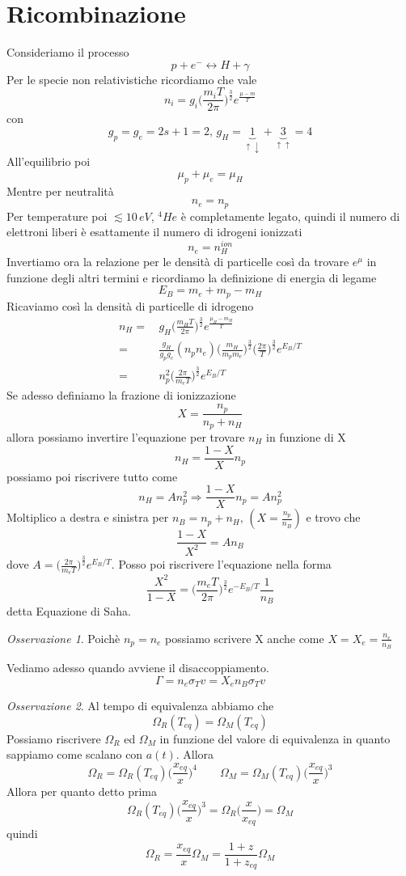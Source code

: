 \documentclass[10pt,a4paper]{article}
\theoremstyle{break}
\theoremstyle{remark}
\newtheorem{oss}{Osservazione}
\theoremstyle{definition}
\newcommand{\ra}{\Rightarrow}
\begin{document}
\section{Ricombinazione}
Consideriamo il processo
\[
p + e^- \longleftrightarrow H + \gamma
\]
Per le specie non relativistiche ricordiamo che vale
\[
n_i = g_i \bigg(\frac{m_i T}{2 \pi}\bigg)^\frac32 e^{\frac{\mu - m}{T}}
\]
con 
\[g_p = g_e = 2s + 1 = 2, \, g_H = \underbrace{1}_{\uparrow\downarrow} + \underbrace{3}_{\uparrow\uparrow} = 4
\]
All'equilibrio poi
\[
\mu_p + \mu_e = \mu_H
\]
Mentre per neutralità
\[
n_e = n_p
\]
Per temperature poi $\lesssim 10 \, eV$, $^4He$ è completamente legato, quindi il numero di elettroni liberi è esattamente il numero di idrogeni ionizzati
\[
n_e = n_H^{ion}
\]
Invertiamo ora la relazione per le densità di particelle così da trovare $e^\mu$ in funzione degli altri termini e ricordiamo la definizione di energia di legame
\[
E_B = m_e + m_p - m_H
\]
Ricaviamo così la densità di particelle di idrogeno
\begin{align*}
n_H =&\, g_H \bigg(\frac{m_H T}{2 \pi}\bigg)^\frac32 e^{\frac{\mu_H - m_H}{T}} \\
    =&\, \frac{g_H}{g_p g_e} (n_p n_e) \bigg(\frac{m_H}{m_p m_e}\bigg)^\frac32\bigg(\frac{2 \pi}{T}\bigg)^\frac32 e^{E_B/T} \\
    =&\, n_p^2 \bigg(\frac{2 \pi}{m_e T}\bigg)^\frac32 e^{E_B/T}
\end{align*}
Se adesso definiamo la frazione di ionizzazione
\[
X = \frac{n_p}{n_p + n_H}
\]
allora possiamo invertire l'equazione per trovare $n_H$ in funzione di X
\[
n_H = \frac{1 - X}{X}n_p
\]
possiamo poi riscrivere tutto come
\[
n_H = A n_p^2 \ra \frac{1 - X}{X} n_p = An_p^2 
\]
Moltiplico a destra e sinistra per $n_B = n_p + n_H,\,(X = \frac{n_p}{n_B})$ e trovo che
\[
\frac{1 - X}{X^2} = A n_B
\]
dove $A = \big(\frac{2 \pi}{m_e T}\big)^\frac32 e^{E_B/T}$. Posso poi riscrivere l'equazione nella forma
\[
\boxed{
	\frac{X^2}{1 - X} = \bigg(\frac{m_e T}{2 \pi}\bigg)^\frac32 e^{-E_B/T}\frac{1}{n_B}
}
\]
detta Equazione di Saha.
\begin{oss}
	Poichè $n_p = n_e$ possiamo scrivere X anche come $X = X_e = \frac{n_e}{n_B}$
\end{oss}

Vediamo adesso quando avviene il disaccoppiamento.
\[
\Gamma = n_e \sigma_T v = X_e n_B \sigma_T v
\]
\begin{oss}
	Al tempo di equivalenza abbiamo che 
	\[
	\Omega_R(T_{eq}) = \Omega_M (T_{eq})
 	\]
 	Possiamo riscrivere $\Omega_R$ ed $\Omega_M$ in funzione del valore di equivalenza in quanto sappiamo come scalano con $a(t)$. Allora
 	\[
 	\Omega_R = \Omega_R(T_{eq}) \bigg(\frac{x_{eq}}{x}\bigg)^4 \qquad \Omega_M = \Omega_M(T_{eq}) \bigg(\frac{x_{eq}}{x}\bigg)^3
 	\]
 	Allora per quanto detto prima
 	\[
 	\Omega_R(T_{eq}) \bigg(\frac{x_{eq}}{x}\bigg)^3 = \Omega_R\bigg(\frac{x}{x_{eq}}\bigg) = \Omega_M
 	\]
 	quindi
 	\[
 	\Omega_R = \frac{x_{eq}}{x} \Omega_M = \frac{1 + z}{1 + z_{eq}}\Omega_M
 	\]
\end{oss}
\end{document}
